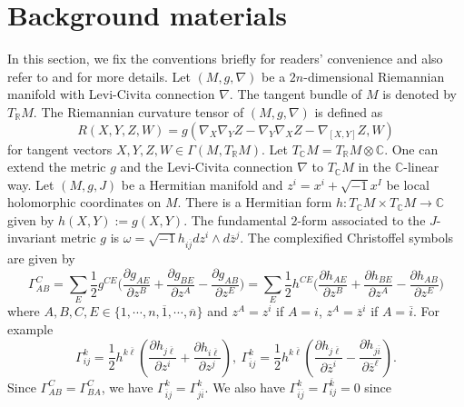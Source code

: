 \documentclass[12pt]{amsart}
\theoremstyle{plain}
\theoremstyle{definition}
\newcommand{\sq}{\sqrt{-1}}
\newcommand{\p}{\partial}
\renewcommand{\bar}{\overline}
\newcommand{\beq}{\begin{equation}}
\newcommand{\eeq}{\end{equation}}
\newcommand{\ts}{\otimes}
\renewcommand{\>}{\rightarrow}
\newcommand{\C}{{\mathbb C}}
\newcommand{\R}{{\mathbb R}}
\numberwithin{equation}{section} %
\begin{document}
	
	
	
	
	
	
	
	
	
	
	

	
	
	
	
	
	\baselineskip

		\section{Background materials}
		In this section, we fix the conventions briefly for readers' convenience and also refer to \cite{LiuYang2017} and \cite{Yang2020MZ} for more details.
	Let $(M, g, \nabla)$ be a $2n$-dimensional Riemannian manifold with
	 Levi-Civita connection $ \nabla$. The tangent bundle of $M$ is denoted by $T_\R M$. The Riemannian curvature tensor of
	$(M,g, \nabla)$ is defined as $$
	R(X,Y,Z,W)=g\left( \nabla_X \nabla_YZ- \nabla_Y \nabla_XZ- \nabla_{[X,Y]}Z,W\right)$$
	for tangent vectors $X,Y,Z,W\in \Gamma(M,T_\R M)$. Let $T_\C M=T_\R M\ts \C$. One can extend the metric $g$ and the
	Levi-Civita connection $ \nabla$ to $T_{\C}M$ in the $\C$-linear way.
	Let $(M,g,J)$ be a Hermitian manifold and $z^i=x^i+\sq x^I$ be  local holomorphic coordinates on $M$.
	\noindent There is a Hermitian form $h:T_\C M\times T_\C M\>\C$ given
	by $ h(X,Y):= g(X,Y)$. The
	fundamental $2$-form associated to the $J$-invariant metric $g$ is  $\omega=\sq h_{i\bar j} dz^i\wedge d\bar z^j$. The complexified Christoffel symbols are given by \beq
	\Gamma_{AB}^C=\sum_{E}\frac{1}{2}g^{CE}\big(\frac{\p g_{AE}}{\p
		z^B}+\frac{\p g_{BE}}{\p z^A}-\frac{\p g_{AB}}{\p
		z^E}\big)=\sum_{E}\frac{1}{2}h^{CE}\big(\frac{\p h_{AE}}{\p
		z^B}+\frac{\p h_{BE}}{\p z^A}-\frac{\p h_{AB}}{\p z^E}\big)\label{realcomplexchristoffelsymbol}
	\eeq
	where $A,B,C,E\in \{1,\cdots,n,\bar{1},\cdots,\bar{n}\}$ and
	$z^{A}=z^{i}$ if $A=i$, $z^{A}=\bar{z}^{i}$ if $A=\bar{i}$. For
	example \beq \Gamma_{ij}^k=\frac{1}{2}h^{k\bar \ell}\left(\frac{\p
		h_{j\bar \ell}}{\p z^i}+\frac{\p h_{i\bar \ell}}{\p z^j}\right),\
	\Gamma_{\bar ij}^k=\frac{1}{2}h^{k\bar \ell}\left(\frac{\p h_{j\bar
			\ell}}{\p \bar z^i}-\frac{\p h_{j\bar i}}{\p \bar
		z^\ell}\right).\label{christoffelsymbols} \eeq Since $\Gamma_{AB}^C=\Gamma_{BA}^C$, we have  $\Gamma_{\bar i j}^k=\Gamma_{j\bar i}^k$. We also have $\Gamma_{\bar i\bar
		j}^k=\Gamma_{ij}^{\bar k}=0$ since
\end{document}
